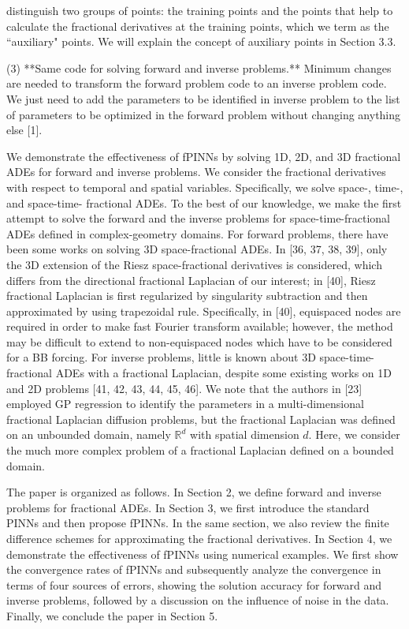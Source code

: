 \documentclass[UTF8]{article}
\begin{document}
\newpage
\setcounter{page}{3}

distinguish two groups of points: the training points and the points that help to calculate the fractional derivatives at the training points, which we term as the “auxiliary" points. We will explain the concept of auxiliary points in Section 3.3.

(3) **Same code for solving forward and inverse problems.** Minimum changes are needed to transform the forward problem code to an inverse problem code. We just need to add the parameters to be identified in inverse problem to the list of parameters to be optimized in the forward problem without changing anything else [1].

We demonstrate the effectiveness of fPINNs by solving 1D, 2D, and 3D fractional ADEs for forward and inverse problems. We consider the fractional derivatives with respect to temporal and spatial variables. Specifically, we solve space-, time-, and space-time- fractional ADEs. To the best of our knowledge, we make the first attempt to solve the forward and the inverse problems for space-time-fractional ADEs defined in complex-geometry domains. For forward problems, there have been some works on solving 3D space-fractional ADEs. In [36, 37, 38, 39], only the 3D extension of the Riesz space-fractional derivatives is considered, which differs from the directional fractional Laplacian of our interest; in [40], Riesz fractional Laplacian is first regularized by singularity subtraction and then approximated by using trapezoidal rule. Specifically, in [40], equispaced nodes are required in order to make fast Fourier transform available; however, the method may be difficult to extend to non-equispaced nodes which have to be considered for a BB forcing. For inverse problems, little is known about 3D space-time-fractional ADEs with a fractional Laplacian, despite some existing works on 1D and 2D problems [41, 42, 43, 44, 45, 46]. We note that the authors in [23] employed GP regression to identify the parameters in a multi-dimensional fractional Laplacian diffusion problems, but the fractional Laplacian was defined on an unbounded domain, namely $\mathbb{R}^d$ with spatial dimension $d$. Here, we consider the much more complex problem of a fractional Laplacian defined on a bounded domain.

The paper is organized as follows. In Section 2, we define forward and inverse problems for fractional ADEs. In Section 3, we first introduce the standard PINNs and then propose fPINNs. In the same section, we also review the finite difference schemes for approximating the fractional derivatives. In Section 4, we demonstrate the effectiveness of fPINNs using numerical examples. We first show the convergence rates of fPINNs and subsequently analyze the convergence in terms of four sources of errors, showing the solution accuracy for forward and inverse problems, followed by a discussion on the influence of noise in the data. Finally, we conclude the paper in Section 5.
\end{document}
